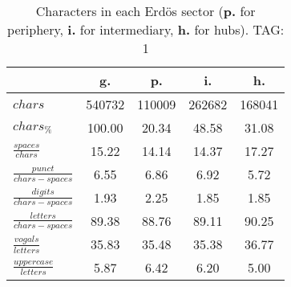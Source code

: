 \begin{table}[h!]
\begin{center}
\begin{tabular}{| l || c | c | c | c |}\hline
 & {\bf g.} & {\bf p.} & {\bf i.} & {\bf h.} \\\hline\hline
$chars$ & 540732  & 110009  & 262682  & 168041 \\
$chars_{\%}$ & 100.00  & 20.34  & 48.58  & 31.08 \\\hline
$\frac{spaces}{chars}$ & 15.22  & 14.14  & 14.37  & 17.27 \\
$\frac{punct}{chars-spaces}$ & 6.55  & 6.86  & 6.92  & 5.72 \\
$\frac{digits}{chars-spaces}$ & 1.93  & 2.25  & 1.85  & 1.85 \\\hline
$\frac{letters}{chars-spaces}$ & 89.38  & 88.76  & 89.11  & 90.25 \\
$\frac{vogals}{letters}$ & 35.83  & 35.48  & 35.38  & 36.77 \\
$\frac{uppercase}{letters}$ & 5.87  & 6.42  & 6.20  & 5.00 \\\hline
\end{tabular}
\caption{Characters in each Erd\"os sector ({{\bf p.}} for periphery, {{\bf i.}} for intermediary, 
    {{\bf h.}} for hubs). TAG: 1}
\end{center}
\end{table}